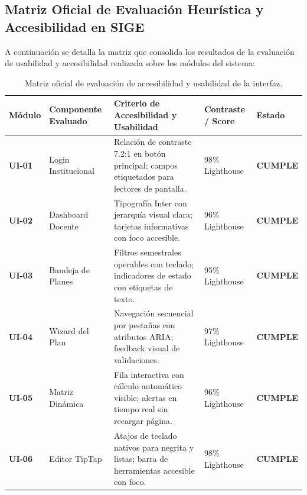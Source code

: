 \documentclass[12pt,a4paper]{article}
\begin{document}
\subsection{Matriz Oficial de Evaluación Heurística y Accesibilidad en SIGE}
A continuación se detalla la matriz que consolida los resultados de la evaluación de usabilidad y accesibilidad realizada sobre los módulos del sistema:

\begin{table}[H]
\centering
\small
\renewcommand{\arraystretch}{1.2}
\begin{tabularx}{\textwidth}{|>{\hsize=0.45\hsize\centering\arraybackslash\bfseries\footnotesize}X|>{\hsize=0.85\hsize\raggedright\arraybackslash\footnotesize}X|>{\hsize=1.5\hsize\raggedright\arraybackslash\footnotesize}X|>{\hsize=0.7\hsize\centering\arraybackslash\footnotesize}X|>{\hsize=0.5\hsize\centering\arraybackslash\footnotesize}X|}
\hline
\rowcolor{tableheader}
\textbf{Módulo} & \textbf{Componente Evaluado} & \textbf{Criterio de Accesibilidad y Usabilidad} & \textbf{Contraste / Score} & \textbf{Estado} \\
\hline
UI-01 & Login Institucional & Relación de contraste 7.2:1 en botón principal; campos etiquetados para lectores de pantalla. & 98\% Lighthouse & \textbf{CUMPLE} \\
\hline
UI-02 & Dashboard Docente & Tipografía Inter con jerarquía visual clara; tarjetas informativas con foco accesible. & 96\% Lighthouse & \textbf{CUMPLE} \\
\hline
UI-03 & Bandeja de Planes & Filtros semestrales operables con teclado; indicadores de estado con etiquetas de texto. & 95\% Lighthouse & \textbf{CUMPLE} \\
\hline
UI-04 & Wizard del Plan & Navegación secuencial por pestañas con atributos ARIA; feedback visual de validaciones. & 97\% Lighthouse & \textbf{CUMPLE} \\
\hline
UI-05 & Matriz Dinámica & Fila interactiva con cálculo automático visible; alertas en tiempo real sin recargar página. & 96\% Lighthouse & \textbf{CUMPLE} \\
\hline
UI-06 & Editor TipTap & Atajos de teclado nativos para negrita y listas; barra de herramientas accesible con foco. & 98\% Lighthouse & \textbf{CUMPLE} \\
\hline
\end{tabularx}
\caption{Matriz oficial de evaluación de accesibilidad y usabilidad de la interfaz.}
\label{tab:eval_interfaz}
\end{table}
\end{document}

